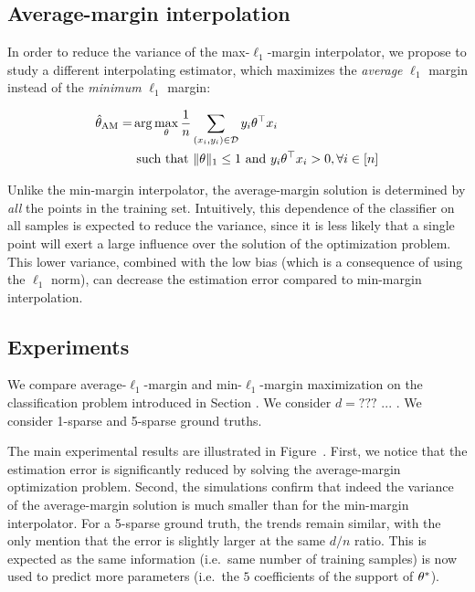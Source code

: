 \subsection{Average-margin interpolation}

In order to reduce the variance of the max-$\ell_1$-margin interpolator, we
propose to study a different interpolating estimator, which maximizes the
\emph{average} $\ell_1$ margin instead of the \emph{minimum} $\ell_1$ margin:

\begin{align}
  \hat{\theta}_{\mathrm{AM}} =& \arg\max_{\theta} \frac{1}{n} \sum_{(x_i, y_i) \in \mathcal{D}} y_i\theta^\top x_i \\
  &\text{ such that }
  \|\theta\|_1 \le 1 \text{ and } y_i\theta^\top x_i > 0, \forall i \in [n]
\end{align}

Unlike the min-margin interpolator, the average-margin solution is determined
by \emph{all} the points in the training set. Intuitively, this dependence of
the classifier on all samples is expected to reduce the variance, since it is
less likely that a single point will exert a large influence over the solution
of the optimization problem. This lower variance, combined with the low bias
(which is a consequence of using the $\ell_1$ norm), can decrease the estimation
error compared to min-margin interpolation.


\subsection{Experiments}

We compare average-$\ell_1$-margin and min-$\ell_1$-margin maximization on the
classification problem introduced in Section . We consider $d=???$ ...
. We consider 1-sparse and 5-sparse ground truths.

The main experimental results are illustrated in Figure~. First, we
notice that the estimation error is significantly reduced by solving the
average-margin optimization problem. Second, the simulations confirm that indeed
the variance of the average-margin solution is much smaller than for the
min-margin interpolator. For a 5-sparse ground truth, the trends remain similar,
with the only mention that the error is slightly larger at the
same $d/n$ ratio. This is expected as the same information (i.e.\ same number of
training samples) is now used to predict more parameters (i.e.\ the $5$
coefficients of the support of $\theta^*$).


